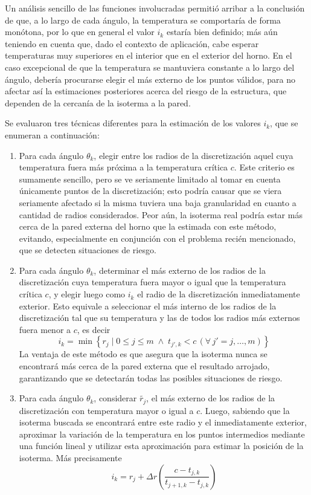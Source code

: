            Un análisis sencillo de las funciones involucradas permitió arribar a la conclusión de que, a lo largo de cada ángulo, la temperatura se comportaría de forma monótona, por lo que en general el valor $i_k$ estaría bien definido; más aún teniendo en cuenta que, dado el contexto de aplicación, cabe esperar temperaturas muy superiores en el interior que en el exterior del horno. En el caso excepcional de que la temperatura se mantuviera constante a lo largo del ángulo, debería procurarse elegir el más externo de los puntos válidos, para no afectar así la estimaciones posteriores acerca del riesgo de la estructura, que dependen de la cercanía de la isoterma a la pared.

            Se evaluaron tres técnicas diferentes para la estimación de los valores $i_k$, que se enumeran a continuación:

            \begin{enumerate}
                \item Para cada ángulo $\theta_k$, elegir entre los radios de la discretización aquel cuya temperatura fuera más próxima a la temperatura crítica $c$. Este criterio es sumamente sencillo, pero se ve seriamente limitado al tomar en cuenta únicamente puntos de la discretización; esto podría causar que se viera seriamente afectado si la misma tuviera una baja granularidad en cuanto a cantidad de radios considerados. Peor aún, la isoterma real podría estar más cerca de la pared externa del horno que la estimada con este método, evitando, especialmente en conjunción con el problema recién mencionado, que se detecten situaciones de riesgo.
                \item Para cada ángulo $\theta_k$, determinar el más externo de los radios de la discretización cuya temperatura fuera mayor o igual que la temperatura crítica $c$, y elegir luego como $i_k$ el radio de la discretización inmediatamente exterior. Esto equivale a seleccionar el más interno de los radios de la discretización tal que su temperatura y las de todos los radios más externos fuera menor a $c$, es decir 
                \[ i_k = \min \left\lbrace r_j \; \vert \; 0 \leq j \leq m \; \land \; t_{j',k} < c \, (\forall \, j' = j, \dots, m) \right\rbrace \]
                La ventaja de este método es que asegura que la isoterma nunca se encontrará más cerca de la pared externa que el resultado arrojado, garantizando que se detectarán todas las posibles situaciones de riesgo.
                \item Para cada ángulo $\theta_k$, considerar $\tilde{r_j}$, el más externo de los radios de la discretización con temperatura mayor o igual a $c$. Luego, sabiendo que la isoterma buscada se encontrará entre este radio y el inmediatamente exterior, aproximar la variación de la temperatura en los puntos intermedios mediante una función lineal y utilizar esta aproximación para estimar la posición de la isoterma. Más precisamente
                \[ i_k = r_j + \Delta r \left(\frac{c - t_{j,k}}{t_{j+1,k} - t_{j,k}} \right) \]
            \end{enumerate}

